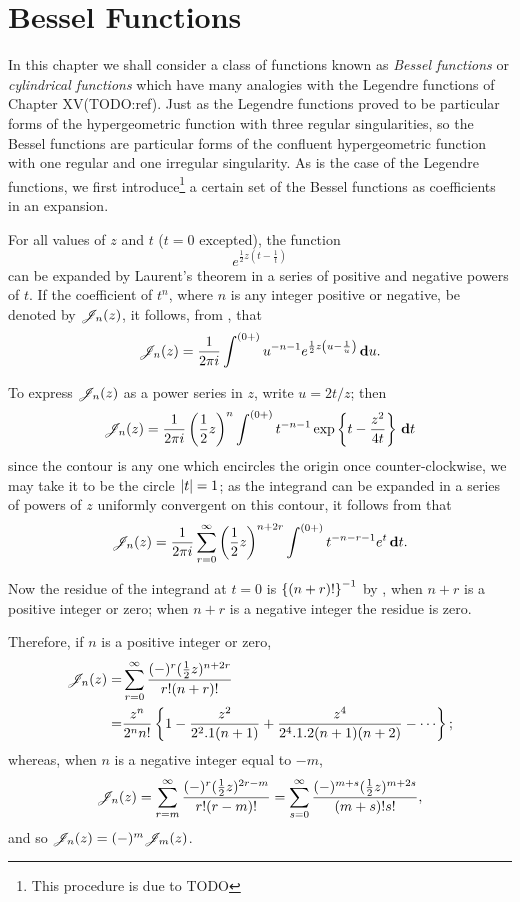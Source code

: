 %
%
\chapter{Bessel Functions}
In this chapter we shall consider a class of functions known as  \emph{Bessel functions}
or \emph{cylindrical functions}
which have many analogies with the Legendre functions of  Chapter XV(TODO:ref).
Just as the Legendre functions proved to be particular forms of the
hypergeometric function with three regular singularities,  so the
Bessel functions are particular forms of the  confluent
hypergeometric function with one regular and one irregular
singularity. As is the case of the Legendre functions, we first
introduce\footnote{This procedure is due to TODO \Schlomilch}
a certain set of the Bessel functions as coefficients in an
expansion.

For all values of $z$ and $t$ ($t=0$ excepted), the function
$$
e^{ \frac{1}{2} z \left( t - \frac{1}{t} \right)}
$$
can be expanded by Laurent's theorem in a series of positive and
negative powers of $t$. If the coefficient of $t^{n}$, where $n$ is any
integer positive or negative, be denoted by
$\mathscr{J}_{n}(z)$, it follows, from 
, that 
$$
\mathscr{J}_{n}(z) = \frac{1}{2\pi i} \int^{(0+)} u^{-n-1} e^{\frac{1}{2} z \left( u
    - \frac{1}{u} \right)} \, \mathbf{d} u.
$$

To express $\mathscr{J}_{n}(z)$ as a power series in $z$, write $u = 2t/z$; then
$$
\mathscr{J}_{n}(z) = \frac{1}{2\pi i} \left( \frac{1}{2} z  \right)^{n} \int^{(0+)} t^{-n-1}
\exp \left\{  t - \frac{z^{2}}{4t}   \right\} \, \mathbf{d} t
$$
since the contour is any one which encircles the origin once 
counter-clockwise, we may take it to be the circle 
$\left| t \right|=1$; as the integrand can be expanded in a series of powers
of $z$ uniformly convergent on this contour, it follows from
 that 
$$
\mathscr{J}_{n}(z)
=
\frac{1}{2\pi i}
\sum_{r=0}^{\infty} \left( \frac{1}{2} z \right)^{n+2r} 
\int^{(0+)} t^{-n-r-1} e^{t} \, \mathbf{d} t.
$$

Now the residue of the integrand at $t=0$ is 
$\left\{  (n+r)!   \right\}^{-1}$ by 
, when $n+r$ is a positive 
integer or zero; when $n+r$ is a negative integer 
the residue is zero.

Therefore, if $n$ is a positive integer or zero, 
\begin{align*}
  \besJ_{n}(z) =& \sum_{r=0}^{\infty} \frac{ (-)^{r} (\half z)^{n+2r} }{
    r!(n+r)! } \\
  =& \frac{ z^{n} }{ 2^{n} n! } 
  \thebrace{ 1 - \frac{z^{2}}{2^{2}.1(n+1)} + \frac{z^{4}}{2^{4}.1.2(n+1)(n+2)}
    - \cdots };
\end{align*}
% 
% 
whereas, when $n$ is a negative integer equal to $-m$,
$$
\mathscr{J}_{n}(z)
= \sum_{r=m}^{\infty} \frac{ (-)^{r} (\frac{1}{2} z)^{2r-m} }{ r!(r-m)!  }
= \sum_{s=0}^{\infty} \frac{ (-)^{m+s} (\frac{1}{2} z)^{m+2s}  }{ (m+s)! s!  },
$$
and so $\mathscr{J}_{n}(z) = (-)^{m} \mathscr{J}_{m}(z)$.


